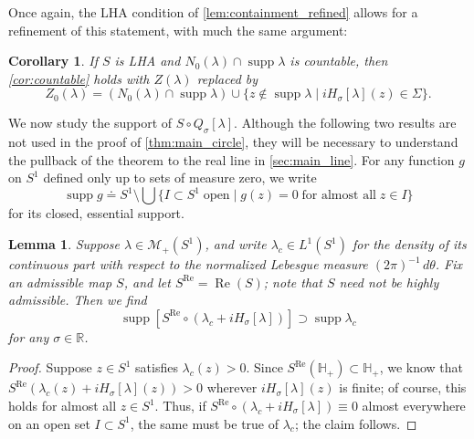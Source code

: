 \documentclass{cams-l} %
\newcommand{\RR}{\mathbb R}
\newcommand{\HH}{\mathbb H}
\newcommand{\cM}{\mathcal M}
\newcommand{\op}{\operatorname}
\newcommand{\supp}{\operatorname{supp}}
\renewcommand{\Re}{\op{Re}}
\newtheorem{lemma}[theorem]{Lemma}
\newtheorem{corollary}[theorem]{Corollary}
\theoremstyle{definition}
\theoremstyle{remark}
\numberwithin{equation}{section}
\begin{document}
Once again, the LHA condition of \cref{lem:containment_refined} allows for a refinement of this statement, with much the same argument:
\begin{corollary}\label{cor:countable_refined}
    If $S$ is LHA and $N_0(\lambda)\cap\supp\lambda$ is countable, then \cref{cor:countable} holds with $Z(\lambda)$ replaced by
    \[Z_0(\lambda) = \left(N_0(\lambda)\cap \supp\lambda\right)\cup\{z\notin\supp\lambda\;|\;iH_\sigma[\lambda](z)\in\Sigma\}.\]
\end{corollary}

We now study the support of $S\circ Q_\sigma[\lambda]$. Although the following two results are not used in the proof of \cref{thm:main_circle}, they will be necessary to understand the pullback of the theorem to the real line in \cref{sec:main_line}. For any function $g$ on $S^1$ defined only up to sets of measure zero, we write 
\[\supp g\doteq S^1\setminus\bigcup\{I\subset S^1\;\text{open}\;|\;g(z)=0\;\text{for almost all}\;z\in I\}\]
for its closed, essential support.

\begin{lemma}\label{lem:support}
    Suppose $\lambda\in\cM_+(S^1)$, and write $\lambda_c\in L^1(S^1)$ for the density of its continuous part with respect to the normalized Lebesgue measure $(2\pi)^{-1}\,d\theta$. Fix an admissible map $S$, and let $S^{\Re} = \Re(S)$; note that $S$ need not be \emph{highly} admissible. Then we find
    \[\supp \left[S^{\Re}\circ(\lambda_c+iH_\sigma[\lambda])\right] \supset\supp \lambda_c\]
    for any $\sigma\in\RR$.
\end{lemma}
\begin{proof}
    Suppose $z\in S^1$ satisfies $\lambda_c(z)>0$. Since $S^{\Re}(\HH_+)\subset \HH_+$, we know that $S^{\Re}(\lambda_c(z) + iH_\sigma[\lambda](z))>0$ wherever $iH_\sigma[\lambda](z)$ is finite; of course, this holds for almost all $z\in S^1$. Thus, if $S^{\Re}\circ(\lambda_c+iH_\sigma[\lambda]) \equiv 0$ almost everywhere on an open set $I\subset S^1$, the same must be true of $\lambda_c$; the claim follows.
\end{proof}
\end{document}
